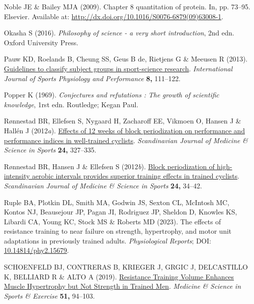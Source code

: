 \documentclass[
  letterpaper,
  DIV=11,
  numbers=noendperiod]{scrreprt}
\newlength{\cslhangindent}
\newenvironment{CSLReferences}[2] %
 {\begin{list}{}{%
  \setlength{\itemindent}{0pt}
  \setlength{\leftmargin}{0pt}
  \setlength{\parsep}{0pt}
  \ifodd #1
   \setlength{\leftmargin}{\cslhangindent}
   \setlength{\itemindent}{-1\cslhangindent}
  \fi
  \setlength{\itemsep}{#2\baselineskip}}}
 {\end{list}}
\begin{document}
\begin{CSLReferences}{1}{1}
Noble JE \& Bailey MJA (2009). Chapter 8 quantitation of protein. In,
pp. 73--95. Elsevier. Available at:
\url{http://dx.doi.org/10.1016/S0076-6879(09)63008-1}.

Okasha S (2016). \emph{Philosophy of science - a very short
introduction}, 2nd edn. Oxford University Press.

Pauw KD, Roelands B, Cheung SS, Geus B de, Rietjens G \& Meeusen R
(2013). \href{https://doi.org/10.1123/ijspp.8.2.111}{Guidelines to
classify subject groups in sport-science research}. \emph{International
Journal of Sports Physiology and Performance} \textbf{8,} 111--122.

Popper K (1969). \emph{Conjectures and refutations : The growth of
scientific knowledge}, 1rst edn. Routledge; Kegan Paul.

Rønnestad BR, Ellefsen S, Nygaard H, Zacharoff EE, Vikmoen O, Hansen J
\& Hallén J (2012\emph{a}).
\href{https://doi.org/10.1111/sms.12016}{Effects of 12 weeks of block
periodization on performance and performance indices in well{-}trained
cyclists}. \emph{Scandinavian Journal of Medicine \& Science in Sports}
\textbf{24,} 327--335.

Rønnestad BR, Hansen J \& Ellefsen S (2012\emph{b}).
\href{https://doi.org/10.1111/j.1600-0838.2012.01485.x}{Block
periodization of high{-}intensity aerobic intervals provides superior
training effects in trained cyclists}. \emph{Scandinavian Journal of
Medicine \& Science in Sports} \textbf{24,} 34--42.

Ruple BA, Plotkin DL, Smith MA, Godwin JS, Sexton CL, McIntosh MC,
Kontos NJ, Beausejour JP, Pagan JI, Rodriguez JP, Sheldon D, Knowles KS,
Libardi CA, Young KC, Stock MS \& Roberts MD (2023). The effects of
resistance training to near failure on strength, hypertrophy, and motor
unit adaptations in previously trained adults. \emph{Physiological
Reports}; DOI:
\href{https://doi.org/10.14814/phy2.15679}{10.14814/phy2.15679}.

SCHOENFELD BJ, CONTRERAS B, KRIEGER J, GRGIC J, DELCASTILLO K, BELLIARD
R \& ALTO A (2019).
\href{https://doi.org/10.1249/mss.0000000000001764}{Resistance Training
Volume Enhances Muscle Hypertrophy but Not Strength in Trained Men}.
\emph{Medicine \& Science in Sports \& Exercise} \textbf{51,} 94--103.


\end{CSLReferences}
\end{document}
